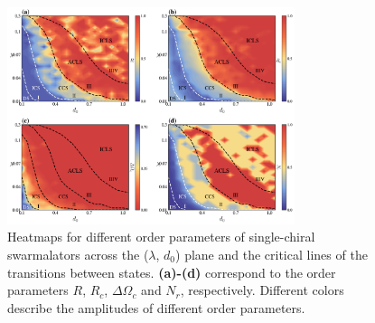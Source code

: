 \documentclass{article}
\begin{document}



\newpage
\begin{figure}[H]
    \centering
    \includegraphics[width=0.75\textwidth]{./figs/monoOrderParam.png}
    \caption{
        \label{fig:monoOrderParam} Heatmaps for different order parameters of single-chiral swarmalators across the ($\lambda$, $d_0$) plane and the critical lines of the transitions between states.
        \textbf{(a)-(d)} correspond to the order parameters $R$, $R_c$, $\Delta \Omega_c$ and $N_r$, respectively.
        Different colors describe the amplitudes of different order parameters.
    }
\end{figure}
\end{document}
